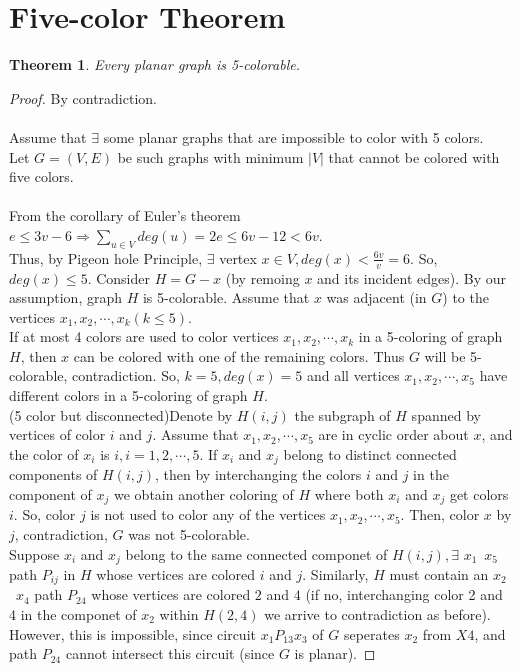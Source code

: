 \documentclass[a4paper]{book}
\newtheorem{theorem}{Theorem}%
\begin{document}
\section*{Five-color Theorem}
\begin{theorem}
Every planar graph is 5-colorable.
\end{theorem}
\begin{proof} By contradiction.\\\\
Assume that $\exists$ some planar graphs that are impossible to color with 5 colors.\\
Let $G=(V,E)$ be such graphs with minimum $|V|$ that cannot be colored with five colors.\\\\
From the corollary of Euler's theorem $e\leq 3v-6\Rightarrow\sum_{u\in V}deg(u)=2e\leq6v-12<6v$.\\ Thus, by Pigeon hole Principle, $\exists$ vertex $x\in V, deg(x)<\frac{6v}{v}=6$. So, $deg(x)\leq5$. Consider $H=G-x$ (by remoing $x$ and its incident edges). By our assumption, graph $H$ is 5-colorable. Assume that $x$ was adjacent (in $G$) to the vertices $x_1,x_2,\cdots,x_k (k\leq5)$.\\
If at most 4 colors are used to color vertices $x_1,x_2,\cdots,x_k$ in a 5-coloring of graph $H$, then $x$ can be colored with one of the remaining colors. Thus $G$ will be 5-colorable, contradiction. So, $k=5, deg(x)=5$ and all vertices $x_1,x_2,\cdots,x_5$ have different colors in a 5-coloring of graph $H$.\\
(5 color but disconnected)Denote by $H(i,j)$ the subgraph of $H$ spanned by vertices of color $i$ and $j$. Assume that $x_1,x_2,\cdots,x_5$ are in cyclic order about $x$, and the color of $x_i$ is $i,i=1,2,\cdots,5$. If $x_i$ and $x_j$ belong to distinct connected components of $H(i,j)$, then by interchanging the colors $i$ and $j$ in the component of $x_j$ we obtain another coloring of $H$ where both $x_i$ and $x_j$ get colors $i$. So, color $j$ is not used to color any of the vertices $x_1,x_2,\cdots,x_5$. Then, color $x$ by $j$, contradiction, $G$ was not 5-colorable.\\
Suppose $x_i$ and $x_j$ belong to the same connected componet of $H(i,j),\exists$ $x_1$~$x_5$ path $P_{ij}$ in $H$ whose vertices are colored $i$ and $j$. Similarly, $H$ must contain an $x_2$~$x_4$ path $P_{24}$ whose vertices are colored $2$ and $4$ (if no, interchanging color 2 and  4 in the componet of $x_2$ within $H(2,4)$ we arrive to contradiction as before). However, this is impossible, since circuit $x_1P_{13}x_3$ of $G$ seperates $x_2$ from $X4$, and path $P_{24}$ cannot intersect this circuit (since $G$ is planar).
\end{proof}
\end{document}
